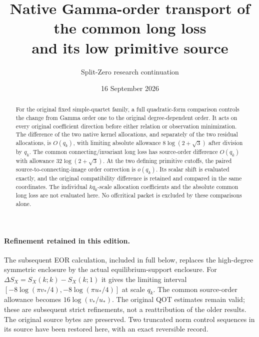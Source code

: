 \documentclass[11pt,a4paper]{article}
\title{Native Gamma-order transport of the common long loss\\and its low primitive source}
\author{Split-Zero research continuation}
\date{16 September 2026}
\begin{document}
\maketitle
\begin{abstract}
For the original fixed simple-quartet family, a full quadratic-form comparison controls the change from Gamma order one to the original degree-dependent order. It acts on every original coefficient direction before either relation or observation minimization. The difference of the two native kernel allocations, and separately of the two residual allocations, is $O(q_k)$, with limiting absolute allowance $8\log(2+\sqrt3)$ after division by $q_k$. The common connecting/invariant long loss has source-order difference $O(q_k)$ with allowance $32\log(2+\sqrt3)$. At the two defining primitive cutoffs, the paired source-to-connecting-image order correction is $o(q_k)$. Its scalar shift is evaluated exactly, and the original compatibility difference is retained and compared in the same coordinates. The individual $kq_k$-scale allocation coefficients and the absolute common long loss are not evaluated here. No offcritical packet is excluded by these comparisons alone.
\end{abstract}
\paragraph{Refinement retained in this edition.}
The subsequent EOR calculation, included in full below, replaces the high-degree
symmetric enclosure by the actual equilibrium-support enclosure. For
$\Delta S_X=S_X(k;k)-S_X(k;1)$ it gives the limiting interval
$[-8\log(\pi v_*/4),-8\log(\pi u_*/4)]$ at scale $q_k$.
The common source-order allowance becomes $16\log(v_*/u_*)$.
The original QOT estimates remain valid; these are subsequent strict refinements,
not a reattribution of the older results. The original source bytes are preserved.
Two truncated norm control sequences in its source have been restored here,
with an exact reversible record.

\tableofcontents
\end{document}
